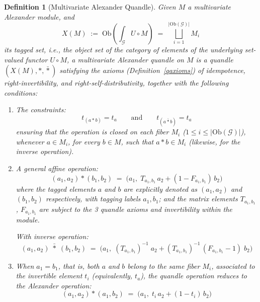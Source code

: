 \documentclass[a4paper,12pt]{article}
\newtheorem{definition}{Definition}[section]
\newcommand{\calG}{\mathcal{G}}
\newcommand{\Ob}{\mathrm{Ob}}
\newcommand{\Gint}[1]{\int_{#1}}
\begin{document}
\begin{definition}[Multivariate Alexander Quandle]  
\label{def:maquand}
Given $M$ a multivariate Alexander module, and 
\[
  X(M) \;:=\; \Ob\!\left(\Gint{\calG} U \circ M \right) \;=\; \bigsqcup_{i=1}^{|\Ob(\calG)|} M_i  
\]
its tagged set, i.e., the object set of the category
of elements of the underlying set-valued functor $U \circ M$,  a  \emph{multivariate Alexander quandle} on $M$ is a quandle $(X(M), *, \bar{*})$ satisfying the axioms (Definition~\ref{qaxioms}) of idempotence, right-invertibility, and right-self-distributivity, together with the following conditions: 

\begin{enumerate}  
  \item  The constraints:  
  $$t_{(a * b)} = t_{a}  \qquad \mbox{and}  \qquad  t_{(a \bar{*} b)} = t_a$$ 
  ensuring that the operation is closed on each fiber $M_i$ ($1 \leq i \leq |\Ob(\calG)|$), whenever $a \in M_i$, for every $b \in M$, such that $a * b \in M_i$  (likewise, for the inverse operation).   

  \item  A general affine operation:    
   \[
          (a_1, a_2) * (b_1, b_2) \;=\; \bigl(a_1, \; T_{ a_1, b_1 }\, a_2 + (1 - F_{ a_1, b_1 })\, b_2 \bigr)  
        \]
  where the tagged elements $a$ and $b$ are explicitly denoted as $(a_1, a_2)$ and  $(b_1, b_2)$ respectively, with tagging labels $a_1, b_1$; and the matrix elements $T_{ a_1, b_1 }$, $F_{ a_1, b_1 }$ are subject to the 3 quandle axioms and invertibility within the module.  
  
With inverse operation:  
  \[
          (a_1, a_2) \; \bar{*} \; (b_1, b_2) \;=\; \bigl(a_1, \; (T_{ a_1, b_1 })^{-1}\; a_2 + (T_{ a_1, b_1 })^{-1} \, (F_{ a_1, b_1 } - 1)\; b_2 \bigr)   
        \]

\item   When $a_1 = b_1$, that is, both $a$ and $b$ belong to the same fiber  $M_i$, associated to the invertible element $t_i$ (equivalently, $t_a$), the quandle operation reduces to the Alexander operation: 
  \[
          (a_1, a_2) * (a_1, b_2) \;=\; \bigl(a_1, \; t_{i}\, a_2 + (1 - t_{i})\, b_2 \bigr) 
        \]
\end{enumerate}
\end{definition}
\end{document}
